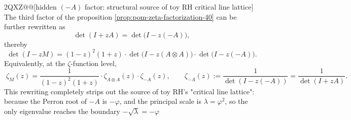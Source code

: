 \begin@@ZXQPH2QXZ@@[hidden \texorpdfstring{$(-A)$}{(-A)} factor: structural source of toy RH critical line lattice]\label{rem:pom-minusA-factor-critical-line}
The third factor of the proposition \ref{prop:pom-zeta-factorization-40} can be further rewritten as
$$
\det(I+zA)=\det\!\bigl(I-z(-A)\bigr),
$$
thereby
$$
\boxed{\;
\det(I-zM)
=(1-z)^2(1+z)\cdot \det\!\bigl(I-z(A\otimes A)\bigr)\cdot \det\!\bigl(I-z(-A)\bigr).
\;}
$$
Equivalently, at the \(\zeta\)-function level,
$$
\boxed{\;
\zeta_M(z)
=\frac{1}{(1-z)^2(1+z)}\cdot \zeta_{A\otimes A}(z)\cdot \zeta_{-A}(z),
\qquad
\zeta_{-A}(z):=\frac{1}{\det(I-z(-A))}=\frac{1}{\det(I+zA)}.
\;}
$$
This rewriting completely strips out the source of toy RH's "critical line lattice": because the Perron root of \(-A\) is \(-\varphi\), and the principal scale is \(\lambda=\varphi^2\), so the only eigenvalue reaches the boundary
\(
-\sqrt{\lambda}=-\varphi
\)
